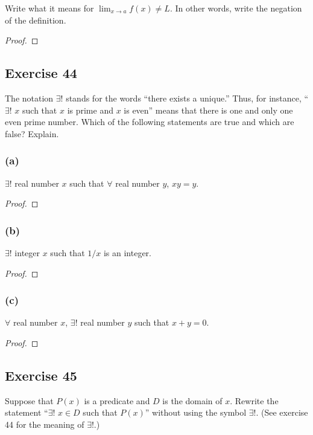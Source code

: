 \documentclass[14pt]{extarticle}
\newcommand{\fa}{\forall}
\newcommand{\te}{\exists}
\begin{document}
Write what it means for $\lim_{x \to a} f(x) \neq L$. In other words, write the negation of the definition.

\begin{proof}

\end{proof}

\subsection{Exercise 44}
The notation $\te$! stands for the words “there exists a unique.” Thus, for instance, “$\te$! $x$ such that $x$ is prime and $x$ is even” means that there is one and only one even prime number. Which of the following statements are true and which are false? Explain.

\subsubsection{(a)}
$\te$! real number $x$ such that $\fa$ real number $y$, $xy = y$.

\begin{proof}

\end{proof}

\subsubsection{(b)}
$\te$! integer $x$ such that $1/x$ is an integer.

\begin{proof}

\end{proof}

\subsubsection{(c)}
$\fa$ real number $x$, $\te$! real number $y$ such that $x + y = 0$.

\begin{proof}

\end{proof}

\subsection{Exercise 45}
Suppose that $P(x)$ is a predicate and $D$ is the domain of $x$. Rewrite the statement “$\te$! $x \in D$ such that $P(x)$” without using the symbol $\te$!. (See exercise 44 for the meaning of $\te$!.)
\end{document}
